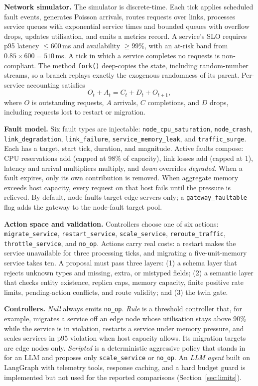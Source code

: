 \documentclass[conference]{IEEEtran}
\begin{document}
\textbf{Network simulator.} The simulator is discrete-time. Each tick applies scheduled fault events, generates Poisson arrivals, routes requests over links, processes service queues with exponential service times and bounded queues with overflow drops, updates utilisation, and emits a metrics record. A service's SLO requires p95 latency $\le 600$\,ms and availability $\ge 99\%$, with an at-risk band from $0.85 \times 600 = 510$\,ms. A tick in which a service completes no requests is non-compliant. The method \texttt{fork()} deep-copies the state, including random-number streams, so a branch replays exactly the exogenous randomness of its parent. Per-service accounting satisfies
\begin{equation}
O_{t} + A_t = C_t + D_t + O_{t+1},
\label{eq:conservation}
\end{equation}
where $O$ is outstanding requests, $A$ arrivals, $C$ completions, and $D$ drops, including requests lost to restart or migration.

\textbf{Fault model.} Six fault types are injectable: \texttt{node\_cpu\_saturation}, \texttt{node\_crash}, \texttt{link\_degradation}, \texttt{link\_failure}, \texttt{service\_memory\_leak}, and \texttt{traffic\_surge}. Each has a target, start tick, duration, and magnitude. Active faults compose: CPU reservations add (capped at 98\% of capacity), link losses add (capped at 1), latency and arrival multipliers multiply, and \emph{down} overrides \emph{degraded}. When a fault expires, only its own contribution is removed. When aggregate memory exceeds host capacity, every request on that host fails until the pressure is relieved. By default, node faults target edge servers only; a \texttt{gateway\_faultable} flag adds the gateway to the node-fault target pool.

\textbf{Action space and validation.} Controllers choose one of six actions: \texttt{migrate\_service}, \texttt{restart\_service}, \texttt{scale\_service}, \texttt{reroute\_traffic}, \texttt{throttle\_service}, and \texttt{no\_op}. Actions carry real costs: a restart makes the service unavailable for three processing ticks, and migrating a five-unit-memory service takes ten. A proposal must pass three layers: (1) a schema layer that rejects unknown types and missing, extra, or mistyped fields; (2) a semantic layer that checks entity existence, replica caps, memory capacity, finite positive rate limits, pending-action conflicts, and route validity; and (3) the twin gate.

\textbf{Controllers.} \emph{Null} always emits \texttt{no\_op}. \emph{Rule} is a threshold controller that, for example, migrates a service off an edge node whose utilisation stays above 90\% while the service is in violation, restarts a service under memory pressure, and scales services in p95 violation when host capacity allows. Its migration targets are edge nodes only. \emph{Scripted} is a deterministic aggressive policy that stands in for an LLM and proposes only \texttt{scale\_service} or \texttt{no\_op}. An \emph{LLM agent} built on LangGraph with telemetry tools, response caching, and a hard budget guard is implemented but not used for the reported comparisons (Section~\ref{sec:limits}).
\end{document}
